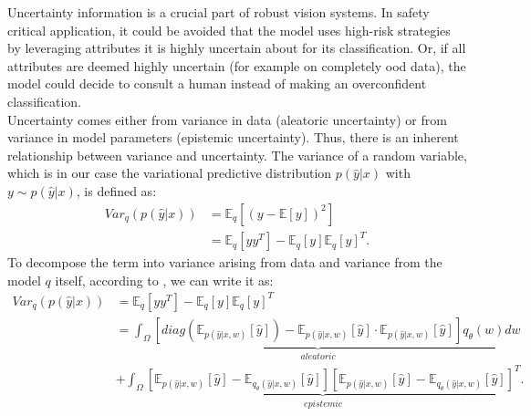 \documentclass[a4paper,cleardoubleempty,BCOR1cm, 11pt]{report}
\begin{document}
Uncertainty information is a crucial part of robust vision systems. In safety critical application, it could be avoided that the model uses high-risk strategies by leveraging attributes it is highly uncertain about for its classification. Or, if all attributes are deemed highly uncertain (for example on completely ood data), the model could decide to consult a human instead of making an overconfident classification.\\
Uncertainty comes either from variance in data (aleatoric uncertainty) or from variance in model parameters (epistemic uncertainty). Thus, there is an inherent relationship between variance and uncertainty.
The variance of a random variable, which is in our case the variational predictive distribution $p(\hat{y} | x)$ with $y\sim p(\hat{y} | x)$, is defined as:
\begin{align}
	Var_q(p(\hat{y} | x)) &= \mathbb{E}_q \left[ (y-\mathbb{E}\left[ y\right])^2 \right]\\
	&= \mathbb{E}_q \left[yy^T\right]  - \mathbb{E}_q\left[y\right]\mathbb{E}_q\left[y\right]^T.
\end{align}
To decompose the term into variance arising from data and variance from the model $q$ itself, according to \citet{kwon2020uncertainty}, we can write it as:
\begin{align}
Var_q(p(\hat{y} | x)) &= \mathbb{E}_q \left[yy^T\right]  - \mathbb{E}_q\left[y\right]\mathbb{E}_q\left[y\right]^T\\
	&\underbrace{=\int_{\Omega}\left[ diag (\mathbb{E}_{p(\hat{y}|x,w)}[\hat{y}]) -\mathbb{E}_{p(\hat{y}|x,w)}[\hat{y}] \cdot \mathbb{E}_{p(\hat{y}|x,w)}[\hat{y}] \right]q_{\theta}(w)dw}_{aleatoric}\\
	&+\underbrace{\int_{\Omega}\left[ \mathbb{E}_{p(\hat{y}|x,w)}[\hat{y}] - \mathbb{E}_{q_{\theta}(\hat{y}|x,w)}[\hat{y}] \right] \left[ \mathbb{E}_{p(\hat{y}|x,w)}[\hat{y}] - \mathbb{E}_{q_{\theta}(\hat{y}|x,w)}[\hat{y}] \right]^T}_{epistemic}.
\end{align}
\end{document}
